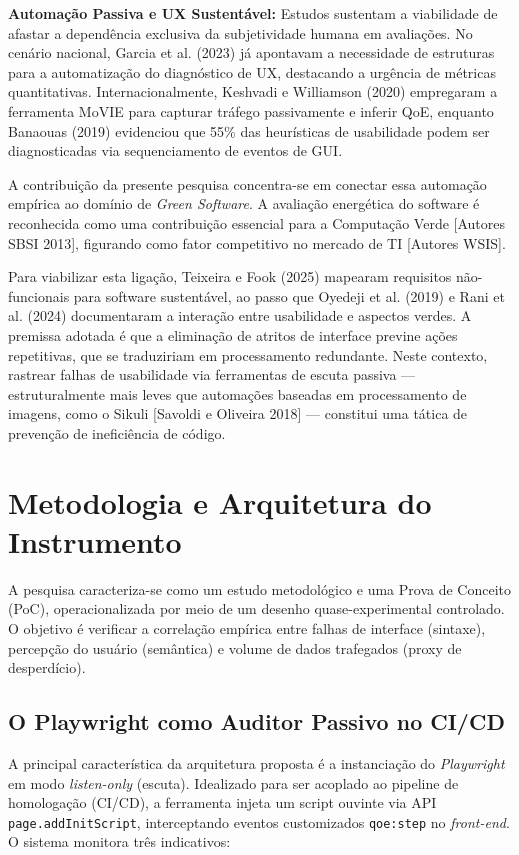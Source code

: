 \documentclass[12pt]{article}
\begin{document}
\textbf{Automação Passiva e UX Sustentável:} Estudos sustentam a viabilidade de afastar a dependência exclusiva da subjetividade humana em avaliações. No cenário nacional, Garcia et al. (2023) já apontavam a necessidade de estruturas para a automatização do diagnóstico de UX, destacando a urgência de métricas quantitativas. Internacionalmente, Keshvadi e Williamson (2020) empregaram a ferramenta MoVIE para capturar tráfego passivamente e inferir QoE, enquanto Banaouas (2019) evidenciou que 55\% das heurísticas de usabilidade podem ser diagnosticadas via sequenciamento de eventos de GUI.

A contribuição da presente pesquisa concentra-se em conectar essa automação empírica ao domínio de \textit{Green Software}. A avaliação energética do software é reconhecida como uma contribuição essencial para a Computação Verde [Autores SBSI 2013], figurando como fator competitivo no mercado de TI [Autores WSIS].

Para viabilizar esta ligação, Teixeira e Fook (2025) mapearam requisitos não-funcionais para software sustentável, ao passo que Oyedeji et al. (2019) e Rani et al. (2024) documentaram a interação entre usabilidade e aspectos verdes. A premissa adotada é que a eliminação de atritos de interface previne ações repetitivas, que se traduziriam em processamento redundante. Neste contexto, rastrear falhas de usabilidade via ferramentas de escuta passiva --- estruturalmente mais leves que automações baseadas em processamento de imagens, como o Sikuli [Savoldi e Oliveira 2018] --- constitui uma tática de prevenção de ineficiência de código.

\section{Metodologia e Arquitetura do Instrumento}

A pesquisa caracteriza-se como um estudo metodológico e uma Prova de Conceito (PoC), operacionalizada por meio de um desenho quase-experimental controlado. O objetivo é verificar a correlação empírica entre falhas de interface (sintaxe), percepção do usuário (semântica) e volume de dados trafegados (proxy de desperdício).

\subsection{O Playwright como Auditor Passivo no CI/CD}

A principal característica da arquitetura proposta é a instanciação do \textit{Playwright} em modo \textit{listen-only} (escuta). Idealizado para ser acoplado ao pipeline de homologação (CI/CD), a ferramenta injeta um script ouvinte via API \texttt{page.addInitScript}, interceptando eventos customizados \texttt{qoe:step} no \textit{front-end}. O sistema monitora três indicativos:
\end{document}

